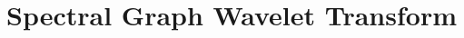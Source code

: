 %
%
%




\chapter{Spectral Graph Wavelet Transform\label{chapter:sgwt}}

\begin{refsection}








\printbibliography[heading=subbibliography]
\end{refsection}
